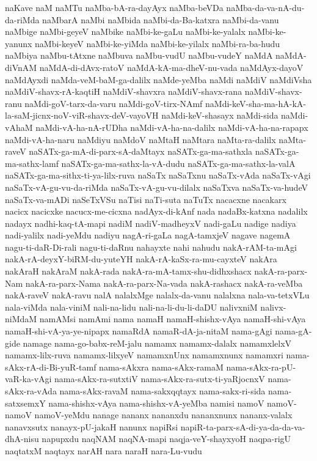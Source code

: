 {naKave
naM
naMTu
naMba-bA-ra-dayAyx
naMba-beVDa
naMba-da-va-nA-du-da-riMda
naMbarA
naMbi
naMbida
naMbi-da-Ba-katxra
naMbi-da-vanu
naMbige
naMbi-geyeV
naMbike
naMbi-ke-gaLu
naMbi-ke-yalalx
naMbi-ke-yanunx
naMbi-keyeV
naMbi-ke-yiMda
naMbi-ke-yilalx
naMbi-ra-ba-hudu
naMbiya
naMbu-tAtxne
naMbuva
naMbu-vudU
naMbu-vudeY
naMdA
naMdA-diVnAM
naMdA-di-dAvx-ratoV
naMdA-kA-ma-dheV-nu-vada
naMdAyx-dayoV
naMdAyxdi
naMda-veM-baM-ga-dalilx
naMde-yeMba
naMdi
naMdiV
naMdiVsha
naMdiV-shavx-rA-kaqtiH
naMdiV-shavxra
naMdiV-shavx-rana
naMdiV-shavx-ranu
naMdi-goV-tarx-da-varu
naMdi-goV-tirx-NAmf
naMdi-keV-sha-ma-hA-kA-la-saM-jicnx-noV-viR-shavx-deV-vayoVH
naMdi-keV-shasayx
naMdi-sida
naMdi-vAhaM
naMdi-vA-ha-nA-rUDha
naMdi-vA-ha-na-dalilx
naMdi-vA-ha-na-rapapx
naMdi-vA-ha-naru
naMdiyu
naMdoV
naMtaH
naMtara
naMta-ra-dalilx
naMta-raveV
naSATx-ga-mA-di-parx-sA-daMtayx
naSATx-ga-ma-sathxla
naSATx-ga-ma-sathx-lamf
naSATx-ga-ma-sathx-la-vA-dudu
naSATx-ga-ma-sathx-la-valA
naSATx-ga-ma-sithx-ti-ya-lilx-ruva
naSaTx
naSaTxnu
naSaTx-vAda
naSaTx-vAgi
naSaTx-vA-gu-vu-da-riMda
naSaTx-vA-gu-vu-dilalx
naSaTxva
naSaTx-va-hudeV
naSaTx-va-mADi
naSeTxVSu
naTisi
naTi-suta
naTuTx
nacacxne
nacakarx
nacicx
nacicxke
nacucx-me-cicxna
nadAyx-di-kAnf
nada
nadaBx-katxna
nadalilx
nadayx
nadhi-kaq-tA-mapi
nadiM
nadiV-madheyxV
nadi-gaLu
nadige
nadiya
nadi-yalilx
nadi-yeMdu
nadiyu
nagA-ri-gaLa
nagA-tamxjeV
nagave
nagemA
nagu-ti-daR-Di-rali
nagu-ti-daRnu
nahayxte
nahi
nahudu
nakA-rAM-ta-mAgi
nakA-rA-deyxY-biRM-du-yuteYH
nakA-rA-kaSx-ra-mu-cayxteV
nakAra
nakAraH
nakAraM
nakA-rada
nakA-ra-mA-tamx-shu-didhxshacx
nakA-ra-parx-Nam
nakA-ra-parx-Nama
nakA-ra-parx-Na-vada
nakA-rashacx
nakA-ra-veMba
nakA-raveV
nakA-ravu
nalA
nalalxMge
nalalx-da-vanu
nalalxna
nala-va-tetxVLu
nala-viMda
nala-viniM
nali-na-lidu
nali-na-li-du-li-daDU
nalivxniM
nalivx-niMdaM
namAMsi
namAmi
nama
namaH
namaH-shishx-vAya
namaH-shi-vAya
namaH-shi-vA-ya-ye-nipapx
namaRdA
namaR-dA-ja-nitaM
nama-gAgi
nama-gA-gide
namage
nama-go-babx-reM-jalu
namamx
namamx-dalalx
namamxlelxV
namamx-lilx-ruva
namamx-lilxyeV
namamxnUnx
namamxnunx
namamxri
nama-sAkx-rA-di-Bi-yuR-tamf
nama-sAkxra
nama-sAkx-ramaM
nama-sAkx-ra-pU-vaR-ka-vAgi
nama-sAkx-ra-sutxtiV
nama-sAkx-ra-sutx-ti-yaRjocnxV
nama-sAkx-ra-vAda
nama-sAkx-ravaM
nama-sakxqqtayx
nama-sakx-ri-sida
nama-satxsemxY
nama-shishx-vAya
nama-shishx-vA-yeMba
namisi
namoV
namoV-namoV
namoV-yeMdu
nanage
nananx
nananxdu
nananxnunx
nananx-valalx
nanavxsutx
nanayx-pU-jakaH
nanunx
napiRsi
napiR-ta-parx-sA-di-ya-da-da-va-dhA-nisu
napupxdu
naqNAM
naqNA-mapi
naqja-veY-shayxyoH
naqpa-rigU
naqtatxM
naqtayx
narAH
nara
naraH
nara-Lu-vudu
}
